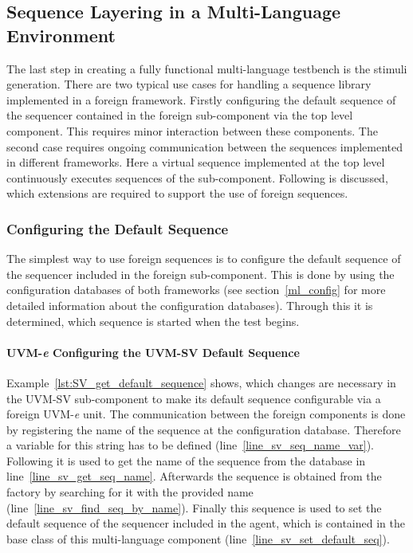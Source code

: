 \subsection{Sequence Layering in a Multi-Language Environment}
The last step in creating a fully functional multi-language testbench is the stimuli generation. There are two typical
use cases for handling a sequence library implemented in a foreign framework. Firstly configuring the default sequence
of the sequencer contained in the foreign sub-component via the top level component. This requires minor interaction between
these components. The second case requires ongoing communication between the sequences implemented in different
frameworks. Here a virtual sequence implemented at the top level continuously executes sequences of the sub-component.
Following is discussed, which extensions are required to support the use of foreign sequences.

\subsubsection{Configuring the Default Sequence}
The simplest way to use foreign sequences is to configure the default sequence of the sequencer included in the foreign
sub-component. This is done by using the configuration databases of both frameworks (see section~\ref{ml_config} for more detailed
information about the configuration databases). Through this it is determined, which sequence is started when the test begins.

\paragraph{UVM-\textit{e} Configuring the UVM-SV Default Sequence}
Example~\ref{lst:SV_get_default_sequence} shows, which changes are necessary in the UVM-SV sub-component to make its default sequence configurable via a foreign UVM-\textit{e} unit. The communication between the foreign components is done by registering the name of the sequence at the configuration database. Therefore a variable for this string has to be defined (line~\ref{line_sv_seq_name_var}). Following it is used to get the name of the sequence from the database in line~\ref{line_sv_get_seq_name}. Afterwards the sequence is obtained from the factory by searching for it with the provided name (line~\ref{line_sv_find_seq_by_name}). Finally this sequence is used to set the default sequence of the sequencer included in the agent, which is contained in the base class of this multi-language component (line~\ref{line_sv_set_default_seq}).   

